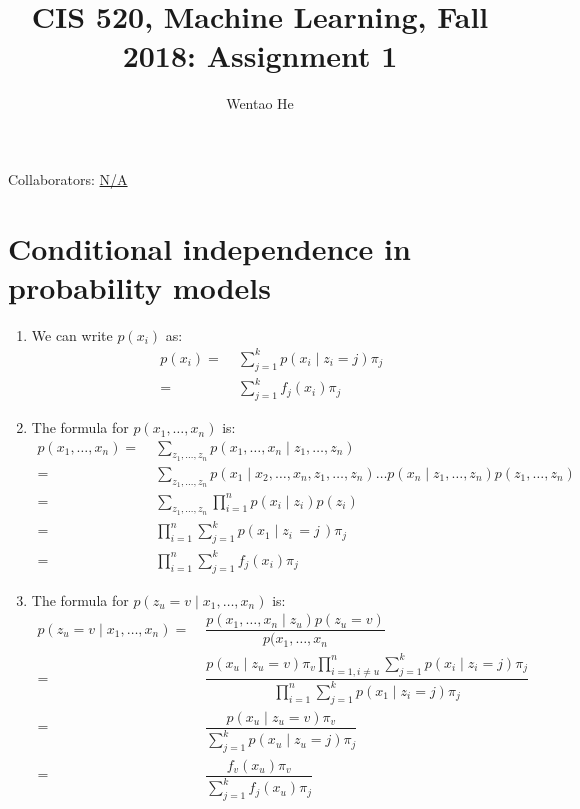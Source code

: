 \documentclass[english]{article}
\title{CIS 520, Machine Learning, Fall 2018: Assignment 1}
\author{Wentao He}
\begin{document}
\maketitle

{\normalsize \noindent Collaborators: \underline{N/A}} \\


\section{Conditional independence in probability models}

\begin{enumerate}
\item We can write $p(x_i)$ as:
  \begin{align*}
    p(x_i) = &\;\sum_{j=1}^{k} p(x_i \mid z_i=j)\pi_j \\
    = &\; \sum_{j=1}^{k} f_j(x_i)\pi_j
  \end{align*}

\item The formula for $p(x_1, \dots, x_n)$ is:
  \begin{align*}
    p(x_1, \dots, x_n) = &\; \sum_{z_1, \dots, z_n} p(x_1, \dots, x_n \mid z_1, \dots, z_n) \\
    =&\; \sum_{z_1, \dots, z_n} p(x_1 \mid x_2, \dots, x_n, z_1, \dots, z_n) \dots p(x_n \mid z_1, \dots, z_n)p(z_1, \dots, z_n) \\
    =&\; \sum_{z_1, \dots, z_n} \prod_{i=1}^{n} p(x_i \mid z_i)p(z_i) \\
    =&\; \prod_{i=1}^{n} \sum_{j=1}^{k} p(x_1 \mid z_i\,=j\,)\pi_j \\
    =&\; \prod_{i=1}^{n} \sum_{j=1}^{k} f_j(x_i)\pi_j
  \end{align*}

\item The formula for $p(z_u = v \mid x_1, \dots, x_n)$ is:
  \begin{align*}
    p(z_u = v \mid x_1, \dots, x_n) = &\; \dfrac{p(x_1, \dots, x_n \mid z_u)p(z_u=v)}{p(x_1, \dots, x_n} \\
    =&\; \dfrac{p(x_u \mid z_u=v) \pi_v \prod_{i=1,i \neq u}^{n} \sum_{j=1}^{k} p(x_i \mid z_i=j) \pi_j}{\prod_{i=1}^{n} \sum_{j=1}^{k} p(x_1 \mid z_i=j) \pi_j} \\
    =&\; \dfrac{p(x_u \mid z_u = v) \pi_v}{\sum_{j=1}^{k} p(x_u \mid z_u = j) \pi_j} \\
    =&\; \dfrac{f_v(x_u)\pi_v}{\sum_{j=1}^{k} f_j(x_u)\pi_j}
  \end{align*}
\end{enumerate}
\end{document}
